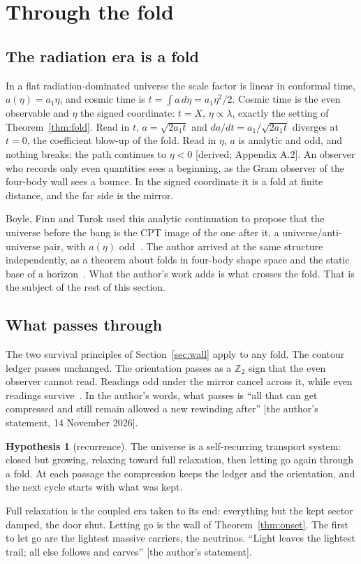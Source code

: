 \documentclass[11pt]{article}
\theoremstyle{definition}\newtheorem{hypothesis}{Hypothesis}\newtheorem{prediction}{Prediction}
\theoremstyle{remark}\newtheorem{remark}[theorem]{Remark}
\newcommand{\grade}[1]{\textsf{\small[#1]}}
\begin{document}
\section{Through the fold}\label{sec:fold}

\subsection{The radiation era is a fold}
In a flat radiation-dominated universe the scale factor is linear in conformal time, $a(\eta)=a_1\eta$, and cosmic time is $t=\int a\,d\eta=a_1\eta^2/2$. Cosmic time is the even observable and $\eta$ the signed coordinate: $t=X$, $\eta\propto\lambda$, exactly the setting of Theorem~\ref{thm:fold}. Read in $t$, $a=\sqrt{2a_1t}$ and $da/dt=a_1/\sqrt{2a_1t}$ diverges at $t=0$, the coefficient blow-up of the fold. Read in $\eta$, $a$ is analytic and odd, and nothing breaks: the path continues to $\eta<0$ \grade{derived; Appendix A.2}. An observer who records only even quantities sees a beginning, as the Gram observer of the four-body wall sees a bounce. In the signed coordinate it is a fold at finite distance, and the far side is the mirror.

Boyle, Finn and Turok used this analytic continuation to propose that the universe before the bang is the CPT image of the one after it, a universe/anti-universe pair, with $a(\eta)$ odd~\cite{BFT,BFT2}. The author arrived at the same structure independently, as a theorem about folds in four-body shape space and the static base of a horizon~\cite{BH}. What the author's work adds is what crosses the fold. That is the subject of the rest of this section.

\subsection{What passes through}
The two survival principles of Section~\ref{sec:wall} apply to any fold. The contour ledger passes unchanged. The orientation passes as a $\mathbb Z_2$ sign that the even observer cannot read. Readings odd under the mirror cancel across it, while even readings survive~\cite{BH}. In the author's words, what passes is ``all that can get compressed and still remain allowed a new rewinding after'' \grade{the author's statement, 14 November 2026}.

\begin{hypothesis}[recurrence]\label{hyp:cycle}
The universe is a self-recurring transport system: closed but growing, relaxing toward full relaxation, then letting go again through a fold. At each passage the compression keeps the ledger and the orientation, and the next cycle starts with what was kept.
\end{hypothesis}
Full relaxation is the coupled era taken to its end: everything but the kept sector damped, the door shut. Letting go is the wall of Theorem~\ref{thm:onset}. The first to let go are the lightest massive carriers, the neutrinos. ``Light leaves the lightest trail; all else follows and carves'' \grade{the author's statement}.
\end{document}
